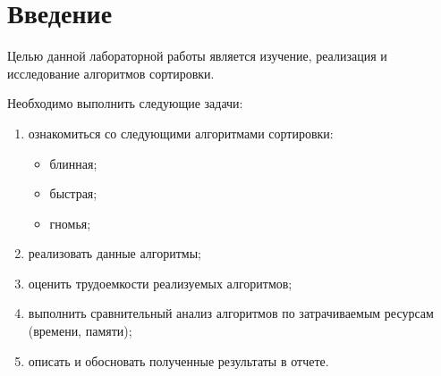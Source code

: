 \chapter*{Введение}

Целью данной лабораторной работы является изучение, реализация и исследование алгоритмов сортировки.

Необходимо выполнить следующие задачи:
\begin{enumerate}[]
    \item ознакомиться со следующими алгоритмами сортировки:
    \begin{itemize}
        \item блинная;
        \item быстрая;
        \item гномья;
    \end{itemize}
    \item реализовать данные алгоритмы;
    \item оценить трудоемкости реализуемых алгоритмов;
    \item выполнить сравнительный анализ алгоритмов по затрачиваемым ресурсам (времени, памяти);
    \item описать и обосновать полученные результаты в отчете.
\end{enumerate}
